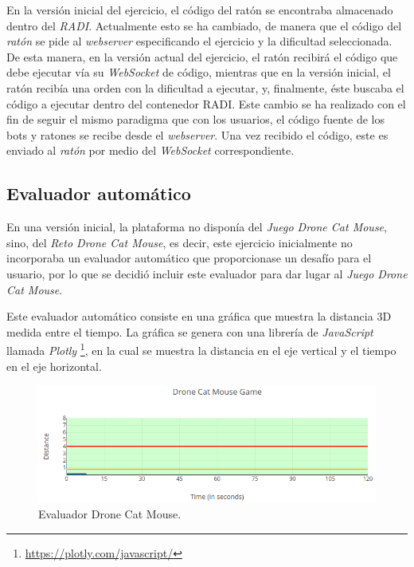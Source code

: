 \documentclass[a4paper, 12pt]{book}
\begin{document}
En la versión inicial del ejercicio, el código del ratón se encontraba almacenado dentro del \emph{RADI}. Actualmente esto se ha cambiado, de manera que el código del \emph{ratón} se pide al \emph{webserver} especificando el ejercicio y la dificultad seleccionada. De esta manera, en la versión actual del ejercicio, el ratón recibirá el código que debe ejecutar vía su \emph{WebSocket} de código, mientras que en la versión inicial, el ratón recibía una orden con la dificultad a ejecutar, y, finalmente, éste buscaba el código a ejecutar dentro del contenedor RADI. Este cambio se ha realizado con el fin de seguir el mismo paradigma que con los usuarios, el código fuente de los bots y ratones se recibe desde el \emph{webserver}. Una vez recibido el código, este es enviado al \emph{ratón} por medio del \emph{WebSocket} correspondiente.

\subsection{Evaluador automático}
\label{drone_cat_mouse_evaluator}

En una versión inicial, la plataforma no disponía del \emph{Juego Drone Cat Mouse}, sino, del \emph{Reto Drone Cat Mouse}, es decir, este ejercicio inicialmente no incorporaba un evaluador automático que proporcionase un desafío para el usuario, por lo que se decidió incluir este evaluador para dar lugar al \emph{Juego Drone Cat Mouse}. 

Este evaluador automático consiste en una gráfica que muestra la distancia 3D medida entre el tiempo. La gráfica se genera con una librería de \emph{JavaScript} llamada \emph{Plotly} \footnote{\url{https://plotly.com/javascript/}}, en la cual se muestra la distancia en el eje vertical y el tiempo en el eje horizontal.

\begin{figure}[H]
	\centering
    \includegraphics[width=16cm]{img/evaluator_drone_cat_mouse.png}
    \caption{Evaluador Drone Cat Mouse.}
    \label{figura:evaluator_drone}
\end{figure}
\end{document}
